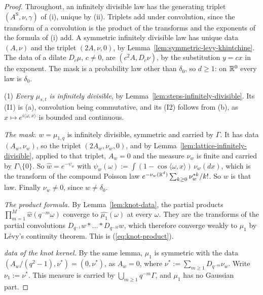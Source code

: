 \begin{proof}
Throughout, an infinitely divisible law has the generating triplet $(A^{\mathrm S}, \nu, \gamma)$ of
(i), unique by (ii). Triplets add under convolution, since the transform of
a convolution is the product of the transforms and the exponents of the formula of (i)
add. A symmetric infinitely divisible law has unique \Levy{} data $(A, \nu)$ and the triplet
$(2A, \nu, 0)$, by Lemma~\ref{lem:symmetric-levy-khintchine}. The data of a dilate $D_c\mu$, $c \ne 0$, are $(c^2A, D_c\nu)$, by the
substitution $y = cx$ in the exponent. The mask is a probability law other than $\delta_0$, so
$d \ge 1$: on $\mathbb{R}^0$ every law is $\delta_0$.

(1) \emph{Every $\mu_{s,t}$ is infinitely divisible}, by
Lemma~\ref{lem:steps-infinitely-divisible}. Its (I1) is (a), convolution being commutative, and its
(I2) follows from (b), as $x \mapsto e^{i\langle\omega, x\rangle}$ is bounded and continuous.

\emph{The mask.} $w = \mu_{1,q}$ is infinitely divisible, symmetric and carried by $\Gamma$. It has
data $(A_w, \nu_w)$, so the triplet $(2A_w, \nu_w, 0)$, and by
Lemma~\ref{lem:lattice-infinitely-divisible}, applied to that triplet, $A_w = 0$ and the \Levy{}
measure $\nu_w$ is finite and carried by $\Gamma \setminus \{0\}$. So
$\widehat{w} = e^{-\psi_w}$ with $\psi_w(\omega) := \int(1 - \cos\langle\omega, x\rangle)\,
\nu_w(dx)$, which is the transform of the compound Poisson law
$e^{-\nu_w(\mathbb{R}^d)}\sum_{k \ge 0}\nu_w^{*k}/k!$. So $w$ is that law. Finally $\nu_w \ne 0$, since
$w \ne \delta_0$.

\emph{The product formula.} By Lemma~\ref{lem:knot-data}, the partial products
$\prod_{m=1}^M\widehat{w}(q^{-m}\omega)$ converge to $\widehat{\mu_1}(\omega)$ at every $\omega$.
They are the transforms of the partial convolutions $D_{q^{-1}}w * \dots * D_{q^{-M}}w$, which
therefore converge weakly to $\mu_1$ by L\'evy's continuity theorem. This is
(\ref{eq:knot-product}).

\emph{\Levy{} data of the knot kernel.} By the same lemma, $\mu_1$ is symmetric with the data
$(A_w/(q^2 - 1), \nu^*) = (0, \nu^*)$, as $A_w = 0$, where $\nu^* := \sum_{m \ge 1}D_{q^{-m}}\nu_w$.
Write $\nu_1 := \nu^*$. This measure is carried by $\bigcup_{m \ge 1}q^{-m}\Gamma$, and $\mu_1$ has
no Gaussian part.


\end{proof}
